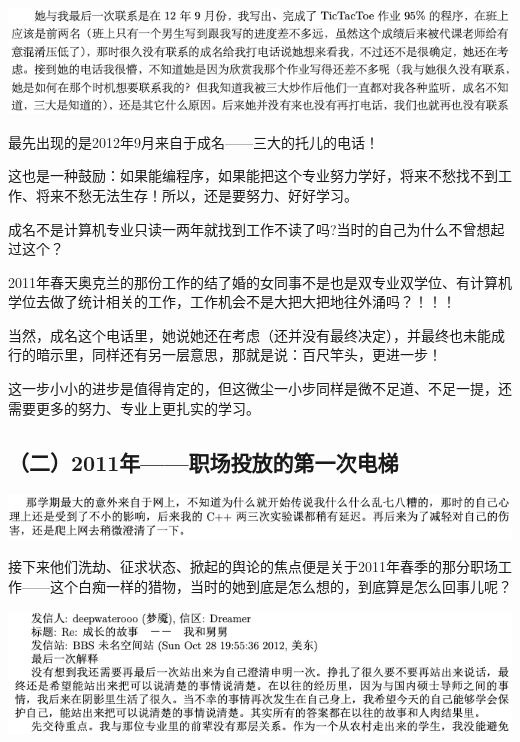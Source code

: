 \documentclass[9pt, b5paper]{article}
\begin{document}
\begin{center}
\includegraphics[width=.9\linewidth]{./pic/backups_plans_20210424_100901.png}
\end{center}

最先出现的是2012年9月来自于成名——三大的托儿的电话！

这也是一种鼓励：如果能编程序，如果能把这个专业努力学好，将来不愁找不到工作、将来不愁无法生存！所以，还是要努力、好好学习。

成名不是计算机专业只读一两年就找到工作不读了吗?当时的自己为什么不曾想起过这个？

2011年春天奥克兰的那份工作的结了婚的女同事不是也是双专业双学位、有计算机学位去做了统计相关的工作，工作机会不是大把大把地往外涌吗？！！！

当然，成名这个电话里，她说她还在考虑（还并没有最终决定），并最终也未能成行的暗示里，同样还有另一层意思，那就是说：百尺竿头，更进一步！

这一步小小的进步是值得肯定的，但这微尘一小步同样是微不足道、不足一提，还需要更多的努力、专业上更扎实的学习。

\subsection{（二）2011年——职场投放的第一次电梯}
\label{sec:org3607652}

\begin{center}
\includegraphics[width=.9\linewidth]{./pic/backups_plans_20210424_205834.png}
\end{center}

接下来他们洗劫、征求状态、掀起的舆论的焦点便是关于2011年春季的那分职场工作——这个白痴一样的猎物，当时的她到底是怎么想的，到底算是怎么回事儿呢？

\begin{center}
\includegraphics[width=.9\linewidth]{./pic/backups_plans_20210424_093531.png}
\end{center}
\end{document}
